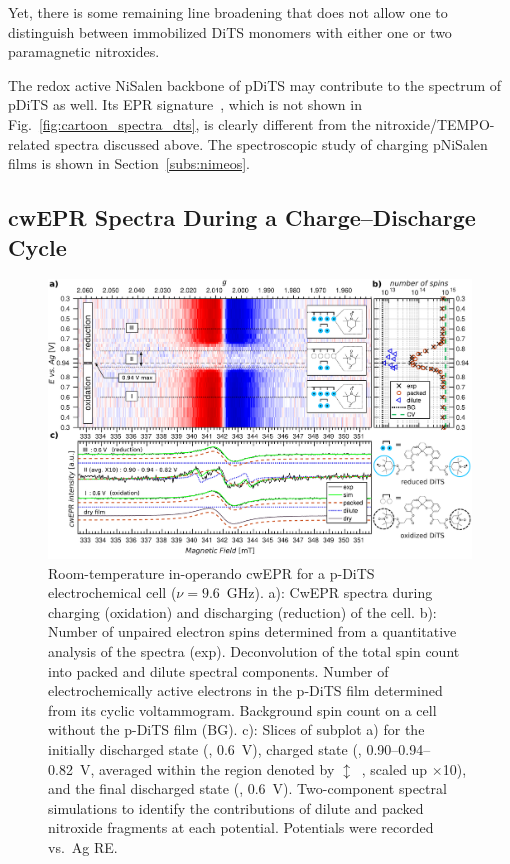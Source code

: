 Yet, there is some remaining line broadening that does not allow one to distinguish between immobilized DiTS monomers with either one or two paramagnetic nitroxides.
\par
The redox active NiSalen backbone of pDiTS may contribute to the spectrum of pDiTS as well. Its EPR signature~\cite{Dmitrieva2018}, which is not shown in Fig.~\ref{fig:cartoon_spectra_dts}, is clearly different from the nitroxide/TEMPO-related spectra discussed above. The spectroscopic study of charging pNiSalen films is shown in Section~\ref{subs:nimeos}.
%

\subsection{cwEPR Spectra During a Charge--Discharge Cycle}
\label{sec:operando_dits}

\begin{figure}[H]
\center
	\includegraphics[width=1\textwidth]{./operando_epr/figures/Main_2D_redox_map_full.pdf}
	\caption{Room-temperature in-operando cwEPR for a p-DiTS electrochemical cell ($\nu = 9.6$~GHz). a): CwEPR spectra during charging (oxidation) and discharging (reduction) of the cell. b): Number of unpaired electron spins determined from a quantitative analysis of the spectra (exp). Deconvolution of the total spin count into packed and dilute spectral components. Number of electrochemically active electrons in the p-DiTS film determined from its cyclic voltammogram. Background spin count on a cell without the p-DiTS film (BG). c): Slices of subplot a) for the initially discharged state (, 0.6~V), charged state (, 0.90--0.94--0.82~V, averaged within the region denoted by $\updownarrow$~, scaled up $\times$10), and the final discharged state (, 0.6~V). Two-component spectral simulations to identify the contributions of dilute and packed nitroxide fragments at each potential. Potentials were recorded vs.\ Ag RE.}
	\label{fig:operando_carpet}
\end{figure}


